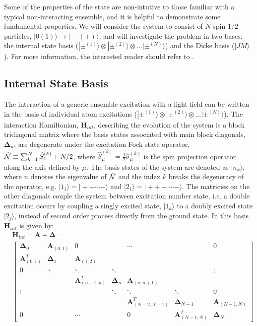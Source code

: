 Some of the properties of the \bbar{} state are non-intutive to those familiar with a typical non-interacting ensemble, and it is helpful to demonstrate some fundamental properties.
We will consider the system to consist of $N$ spin $1/2$ particles, $|0(1)\rangle\rightarrow|-(+)\rangle$, and will investigate the problem in two bases: the internal state basis ($ |\pm^{(1)}\rangle \otimes |\pm^{(2)}\rangle \otimes ... |\pm^{(N)}\rangle$) and the Dicke basis ($|JM\rangle$).
For more information, the interested reader should refer to \cite{Arecchi1972}.

\subsection{Internal State Basis}\label{sec_idealmodel}
The interaction of a generic ensemble excitation with a light field can be written in the basis of individual atom excitations ($ |\pm^{(1)}\rangle \otimes |\pm^{(2)}\rangle \otimes ... |\pm^{(N)}\rangle$).
The interaction Hamiltonian, $\mathbf{H}_{int}$, describing the evolution of the system is a block tridiagonal matrix where the basis states associated with main block diagonals, $\mathbf{\Delta}_{n}$, are degenerate under the excitation Fock state operator, $\hat{\cal{N}} \equiv \sum_{k=1}^N \hat{S}_z^{(k)} + N/2$, where $\hat{S}_{\mu}^{(k)}=\frac{1}{2}\hat{\sigma}_{\mu}^{(k)}$ is the spin projection operator along the axis defined by $\mu$.
The basis states of the system are denoted as $|n_k\rangle$, where $n$ denotes the eigenvalue of $\hat{\cal{N}}$ and the index $k$ breaks the degeneracy of the operator, e.g. $|1_1\rangle=|+-\cdots -\rangle$ and $|2_1\rangle = |++-\cdots -\rangle$.
The matricies on the other diagonals couple the system between excitation number state, i.e. a double excitation occurs by coupling a singly excited state, $|1_k\rangle$ to a doubly excited state $|2_j\rangle$, instead of second order process directly from the ground state.
In this basis $\mathbf{H}_{int}$ is given by:
\begin{equation}
  \label{eqn_blocktridiagonal}
  \begin{split}
    &\mathbf{H}_{int} = \mathbf{A} + \mathbf{\Delta} = \\
    &\begin{bmatrix}
      \mathbf{\Delta}_{0} & \mathbf{A}_{(0,1)} & 0 & & \cdots & & 0 \\
      \mathbf{A}^{T}_{(0,1)} & \mathbf{\Delta}_{1} & \mathbf{A}_{(1,2)} & & & & \\
      0 & \ddots & \ddots & \ddots & & & \vdots \\
        & & \mathbf{A}^{T}_{(n-1,n)} & \mathbf{\Delta}_{n} & \mathbf{A}_{(n,n+1)} & & \\
      \vdots & & & \ddots & \ddots & \ddots & 0 \\
        & &        & & \mathbf{A}^{T}_{(N-2,N-1)} & \mathbf{\Delta}_{N-1} & \mathbf{A}_{(N-1,N)}   \\
      0 & & \cdots & & 0 & \mathbf{A}^{T}_{(N-1,N)} & \mathbf{\Delta}_{N}
    \end{bmatrix}
  \end{split}
\end{equation}

